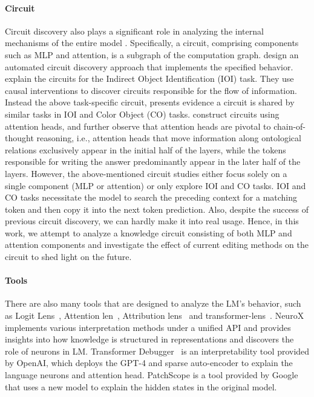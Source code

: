 \paragraph{Circuit}
Circuit discovery also plays a significant role in analyzing the internal mechanisms of the entire model \cite{elhage2021mathematical}.
Specifically, a circuit, comprising components such as MLP and attention, is a subgraph of the computation graph.
\citet{acdc} design an automated circuit discovery approach that implements the specified behavior.
\citet{wang2023interpretability} explain the circuits for the Indirect Object Identification (IOI) task. They use causal interventions to discover circuits responsible for the flow of information.
Instead the above task-specific circuit, \citet{merullo2023circuit} presents evidence a circuit is shared by similar tasks in IOI and Color Object (CO) tasks.
\citet{DBLP:journals/corr/abs-2402-18312} construct circuits using attention heads, and further observe that attention heads are pivotal to chain-of-thought reasoning, i.e., attention heads that move information along ontological relations exclusively appear in the initial half of the layers, while the tokens responsible for writing the answer predominantly appear in the later half of the layers.
However, the above-mentioned circuit studies either focus solely on a single component (MLP or attention) or only explore IOI and CO tasks.
IOI and CO tasks necessitate the model to search the preceding context for a matching token and then copy it into the next token prediction.
Also, despite the success of previous circuit discovery, we can hardly make it into real usage.
Hence, in this work, we attempt to analyze a knowledge circuit consisting of both MLP and attention components and investigate the effect of current editing methods on the circuit to shed light on the future.

\paragraph{Tools}
There are also many tools that are designed to analyze the LM's behavior, such as Logit Lens~\cite{logitlens}, Attention len~\cite{yuksekgonul2024attention}, Attribution lens~\cite{hernandez2024linearity} and transformer-lens~\cite{nanda2022transformerlens}.
NeuroX~\cite{NeuroX} implements various interpretation methods under a unified API and provides insights into how knowledge is structured in representations and discovers the role of neurons in LM.
Transformer Debugger~\cite{mossing2024tdb} is an interpretability tool provided by OpenAI, which deploys the GPT-4 and sparse auto-encoder to explain the language neurons and attention head.
PatchScope \cite{ghandeharioun2024patchscopes} is a tool provided by Google that uses a new model to explain the hidden states in the original model.






